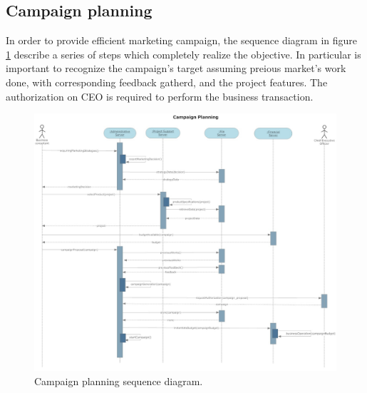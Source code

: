 \subsection{Campaign planning}
In order to provide efficient marketing campaign, the sequence diagram in figure \ref{3img:[sequence]campaign_planning} describe a series of steps which completely realize the objective. In particular is important to recognize the campaign's target assuming preious market's work done, with corresponding feedback gatherd, and the project features. The authorization on CEO is required to perform the business transaction.

\begin{figure}[H]
\begin{centering}
\includegraphics[scale=0.35,angle=90]{assign3/sdraw/imgs/campaign_planning.jpg}
\caption{Campaign planning sequence diagram.}
\label{3img:[sequence]campaign_planning}
\end{centering}
\end{figure}
